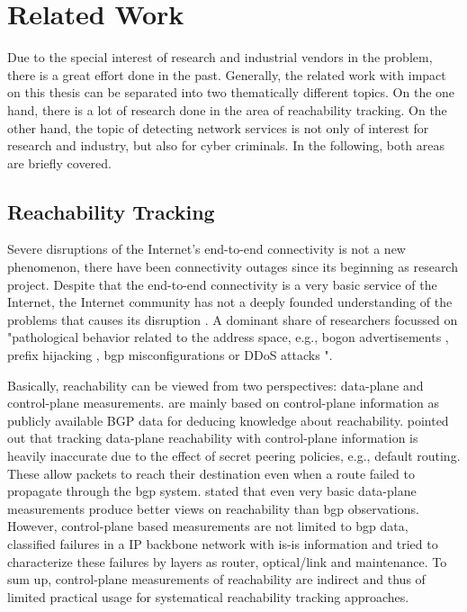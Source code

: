 \section{Related Work 
\label{sec:related_work}}
Due to the special interest of research and industrial vendors in the problem, there is a great effort done in the past. 
Generally, the related work with impact on this thesis can be separated into two thematically different topics.
On the one hand, there is a lot of research done in the area of reachability tracking. 
On the other hand, the topic of detecting network services is not only of interest for research and industry, but also for cyber criminals. 
In the following, both areas are briefly covered. 

\subsection{Reachability Tracking}

Severe disruptions of the Internet's end-to-end connectivity is not a new phenomenon, there have been connectivity outages since its beginning as research project. 
Despite that the end-to-end connectivity is a very basic service of the Internet, the Internet community has not a deeply founded understanding of the problems that causes its disruption \citep{Bush:Optometry}.
A dominant share of researchers focussed on "pathological behavior related to the address space, e.g., bogon advertisements \citep{Feamster:2005}, prefix hijacking \citep{Zhang:2010}, \gls{bgp} misconfigurations \citep{Mahajan:2002} or \gls{DDoS} attacks \citep{Chen:2001}"\citep{Bush:Optometry}.

Basically, reachability can be viewed from two perspectives: \gls{data-plane} and \gls{control-plane} measurements. \citep{Feamster:2005,Zhang:2010,Mahajan:2002,Chen:2001} are mainly based on \gls{control-plane} information as publicly available BGP data for deducing knowledge about reachability. 
\citet{Bush:Optometry} pointed out that tracking \gls{data-plane} reachability with \gls{control-plane} information is heavily inaccurate due to the effect of secret peering policies, e.g., default routing. 
These allow packets to reach their destination even when a route failed to propagate through the \gls{bgp} system. 
\citet{Bush:Optometry} stated that even very basic \gls{data-plane} measurements
produce better views on reachability than \gls{bgp} observations. 
However, \gls{control-plane} based measurements are not limited to \gls{bgp} data, \citet{Markopoulou:2008} classified failures in a IP backbone network with \gls{is-is} information and tried to characterize these failures by layers as router, optical/link and maintenance. 
To sum up, \gls{control-plane} measurements of reachability are indirect and thus of limited practical usage for systematical reachability tracking approaches.

